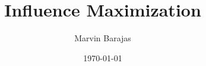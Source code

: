 \documentclass{article}
\title{Influence Maximization}
\author{Marvin Barajas}
\date{\today}			%
\begin{document}
\maketitle			%

\begin{thebibliography}{99}	%

\cite{9695654} 
\cite{9188557}
\cite{9045797}
\cite{10000698}
\cite{9668587}
\cite{10035644}
\cite{10053447}
\cite{8681423}
\cite{9744500}
\cite{10072595}
\cite{8855546}
\cite{9169627}
\cite{9929315}
\cite{9721514}
\cite{8727988}

\end{thebibliography}
\end{document}
